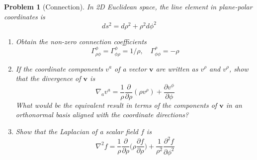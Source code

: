 \documentclass[a4paper]{article}
\theoremstyle{new}
\newtheorem{qns}{Problem}[section]
\begin{document}
\newpage
\begin{qns}[Connection]
In 2D Euclidean space, the line element in plane-polar coordinates is
$$ds^2=d\rho^2+\rho^2d\phi^2$$
\begin{enumerate}[label=(\alph*)]
\item Obtain the non-zero connection coefficients
$$\Gamma_{\rho\phi}^\phi=\Gamma_{\phi\rho}^\phi=1/\rho,\quad\Gamma_{\phi\phi}^\rho=-\rho$$
\item If the coordinate components $v^a$ of a vector $\mathbf{v}$ are written as $v^\rho$ and $v^\rho$, show that the divergence of $\mathbf{v}$ is
$$\nabla_av^a=\frac{1}{\rho}\frac{\partial}{\partial\rho}(\rho v^\rho)+\frac{\partial v^\phi}{\partial\phi}$$
What would be the equivalent result in terms of the components of $\mathbf{v}$ in an orthonormal basis aligned with the coordinate directions?
\item Show that the Laplacian of a scalar field $f$ is
$$\nabla^2f=\frac{1}{\rho}\frac{\partial}{\partial\rho}\bigg(\rho\frac{\partial f}{\partial\rho}\bigg)+\frac{1}{\rho^2}\frac{\partial^2f}{\partial\phi^2}$$
\end{enumerate}
\end{qns}
\end{document}
